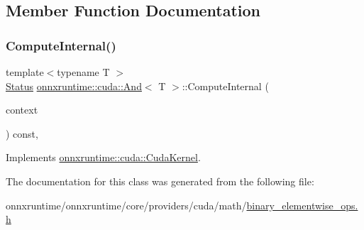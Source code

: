 \subsection{Member Function Documentation}
\mbox{\label{classonnxruntime_1_1cuda_1_1And_a691b266d0442b0d513fe433c2e0c04d8}} 
\subsubsection{\texorpdfstring{Compute\+Internal()}{ComputeInternal()}}
{\footnotesize\ttfamily template$<$typename T $>$ \\
\mbox{\hyperlink{classonnxruntime_1_1common_1_1Status}{Status}} \mbox{\hyperlink{classonnxruntime_1_1cuda_1_1And}{onnxruntime\+::cuda\+::\+And}}$<$ T $>$\+::Compute\+Internal (\begin{DoxyParamCaption}\item[{\mbox{\hyperlink{classonnxruntime_1_1OpKernelContext}{Op\+Kernel\+Context}} $\ast$}]{context }\end{DoxyParamCaption}) const\hspace{0.3cm}{\ttfamily [override]}, {\ttfamily [virtual]}}



Implements \mbox{\hyperlink{classonnxruntime_1_1cuda_1_1CudaKernel_aca7af04ae448017d6023d30bba231ebb}{onnxruntime\+::cuda\+::\+Cuda\+Kernel}}.



The documentation for this class was generated from the following file\+:\begin{DoxyCompactItemize}
\item 
onnxruntime/onnxruntime/core/providers/cuda/math/\mbox{\hyperlink{binary__elementwise__ops_8h}{binary\+\_\+elementwise\+\_\+ops.\+h}}\end{DoxyCompactItemize}
